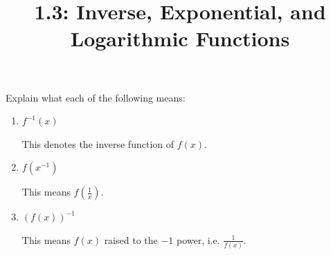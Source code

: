 \documentclass[nooutcomes]{ximera}
\title{1.3:  Inverse, Exponential, and Logarithmic Functions}
\begin{document}
\begin{abstract}		\end{abstract}
\maketitle


\begin{problem}
Explain what each of the following means:

  \begin{enumerate}

  \item $f^{-1}(x)$
    \begin{freeResponse}
      This denotes the inverse function of $f(x)$.
    \end{freeResponse}
		
  \item $f(x^{-1})$
    \begin{freeResponse}
      This means $f \left( \frac{1}{x} \right)$.
    \end{freeResponse}
		
  \item $\left( f(x) \right)^{-1}$
    \begin{freeResponse}
      This means $f(x)$ raised to the $-1$ power,
      i.e. $\frac{1}{f(x)}$.
    \end{freeResponse}
  \end{enumerate}
\end{problem}
\end{document}
